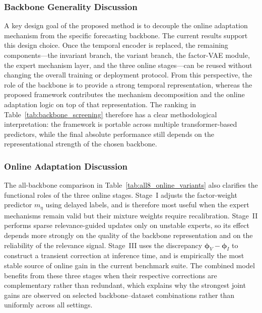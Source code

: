 ﻿\documentclass[journal]{IEEEtran}
\begin{document}
\subsubsection{Backbone Generality Discussion}
A key design goal of the proposed method is to decouple the online adaptation mechanism from the specific forecasting backbone. The current results support this design choice. Once the temporal encoder is replaced, the remaining components---the invariant branch, the variant branch, the factor-VAE module, the expert mechanism layer, and the three online stages---can be reused without changing the overall training or deployment protocol. From this perspective, the role of the backbone is to provide a strong temporal representation, whereas the proposed framework contributes the mechanism decomposition and the online adaptation logic on top of that representation. The ranking in Table~\ref{tab:backbone_screening} therefore has a clear methodological interpretation: the framework is portable across multiple transformer-based predictors, while the final absolute performance still depends on the representational strength of the chosen backbone.

\subsubsection{Online Adaptation Discussion}
The all-backbone comparison in Table~\ref{tab:all8_online_variants} also clarifies the functional roles of the three online stages. Stage~I adjusts the factor-weight predictor $m_{\eta}$ using delayed labels, and is therefore most useful when the expert mechanisms remain valid but their mixture weights require recalibration. Stage~II performs sparse relevance-guided updates only on unstable experts, so its effect depends more strongly on the quality of the backbone representation and on the reliability of the relevance signal. Stage~III uses the discrepancy $\boldsymbol{\phi}_V-\boldsymbol{\phi}_I$ to construct a transient correction at inference time, and is empirically the most stable source of online gain in the current benchmark suite. The combined model benefits from these three stages when their respective corrections are complementary rather than redundant, which explains why the strongest joint gains are observed on selected backbone--dataset combinations rather than uniformly across all settings.
\end{document}
